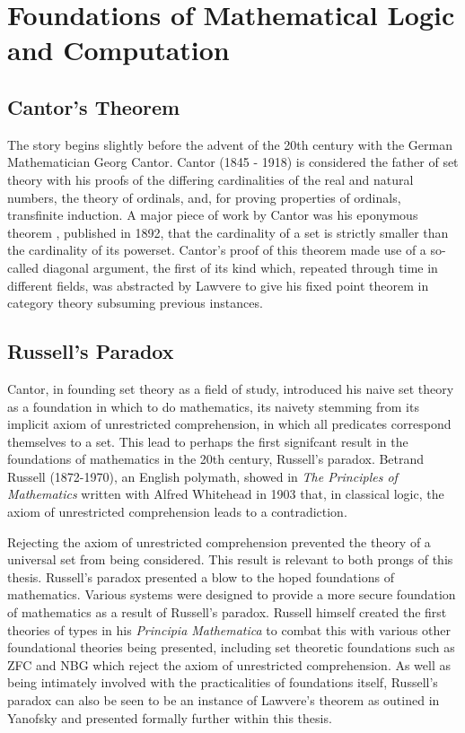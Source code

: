 \section{Foundations of Mathematical Logic and Computation}

\subsection{Cantor's Theorem}

The story begins slightly before the advent of the 20th century with the German
Mathematician Georg Cantor. Cantor (1845 - 1918) is considered the father of
set theory with his proofs of the differing cardinalities of the real and
natural numbers, the theory of ordinals, and, for proving properties of
ordinals, transfinite induction. A major piece of work by Cantor was his
eponymous theorem \cite{cantor1892ueber}, published in 1892,
that the cardinality of a set is strictly smaller than the cardinality of its
powerset. Cantor's proof of this theorem made use of a so-called diagonal
argument, the first of its kind which, repeated through time in different
fields, was abstracted by Lawvere to give his fixed point theorem in category
theory subsuming previous instances.

\subsection{Russell's Paradox}
Cantor, in founding set theory as a field of study, introduced his naive set
theory \cite{Cantor:1874} as a foundation in which to do mathematics, its
naivety stemming from its implicit axiom of unrestricted comprehension, in which
all predicates correspond themselves to a set. This lead to perhaps the first
signifcant result in the foundations of mathematics in the 20th century,
Russell's paradox. Betrand Russell (1872-1970), an English polymath, showed in
\textit{The Principles of Mathematics} \cite{russell1903principles} written with
Alfred Whitehead in 1903 that, in classical logic, the axiom of unrestricted
comprehension leads to a contradiction.


Rejecting the axiom of unrestricted comprehension prevented the theory of a
universal set from being considered.  This result is relevant to both prongs of
this thesis. Russell's paradox presented a blow to the hoped foundations of
mathematics. Various systems were designed to provide a more secure foundation
of mathematics as a result of Russell's paradox. Russell himself created the
first theories of types in his \textit{Principia Mathematica} \cite{russell25} to combat this
with various other foundational theories being presented, including set
theoretic foundations such as ZFC and NBG which reject the axiom of unrestricted
comprehension. As well as being intimately involved with the practicalities of
foundations itself, Russell's paradox can also be seen to be an instance of
Lawvere's theorem as outined in Yanofsky and presented formally further within
this thesis.

